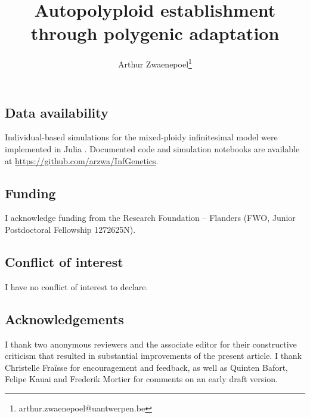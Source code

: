 \documentclass[12pt,a4paper]{article}
\begin{document}
\title{Autopolyploid establishment through polygenic adaptation}
\author[1]{Arthur Zwaenepoel\thanks{arthur.zwaenepoel@uantwerpen.be}}
\date{\vspace{-5ex}}
\maketitle

\subsection*{Data availability}

Individual-based simulations for the mixed-ploidy infinitesimal model were
implemented in Julia \citep{julia}.
Documented code and simulation notebooks are available at 
\url{https://github.com/arzwa/InfGenetics}.

\subsection*{Funding} 

I acknowledge funding from the Research Foundation -- Flanders (FWO, Junior
Postdoctoral Fellowship 1272625N).

\subsection*{Conflict of interest}

I have no conflict of interest to declare.

\subsection*{Acknowledgements}

I thank two anonymous reviewers and the associate editor for their constructive
criticism that resulted in substantial improvements of the present article.
I thank Christelle Fraïsse for encouragement and feedback, as well as Quinten
Bafort, Felipe Kauai and Frederik Mortier for comments on an early draft
version.




\end{document}
